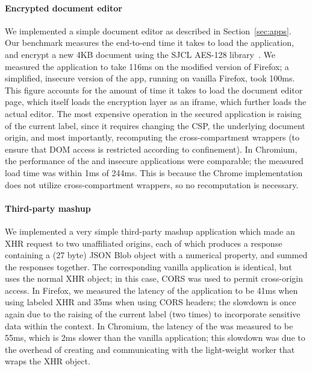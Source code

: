 \paragraph{Encrypted document editor}

We implemented a simple document editor as described in
Section~\ref{sec:apps}.
%
Our benchmark measures the end-to-end time it takes to load the
application, and encrypt a new 4KB document using
the SJCL AES-128 library~\cite{sjcl}.
%
We measured the \sys{} application to take 116ms on the modified
version of Firefox; a simplified, insecure version of the app,
running on vanilla Firefox, took 100ms.
%
This figure accounts for the amount of time it takes to
load the document editor page, which itself loads the encryption layer
as an iframe, which further loads the actual editor.
%
The most expensive operation in the secured application
is raising of the current label, since it requires changing the CSP, the
underlying document origin, and most importantly, recomputing the
cross-compartment wrappers (to ensure that DOM access is restricted
according to confinement).
%
In Chromium, the performance of the \sys{} and insecure applications
were comparable; the measured load time was within 1ms of 244ms.
%
This is because the Chrome implementation does not utilize cross-compartment
wrappers, so no recomputation is necessary.


\paragraph{Third-party mashup}

We implemented a very simple third-party mashup application which
made an XHR request to two unaffiliated origins, each
of which produces a response containing a (27 byte) JSON Blob
object with a numerical property, and summed the responses
together.
%
The corresponding vanilla application is identical, but uses the normal
XHR object; in this case, CORS was used to permit cross-origin access.
%
In Firefox, we measured the latency of the application to be 41ms when
using labeled XHR and 35ms when using CORS headers; the slowdown is once
again due to the raising of the current label (two times) to incorporate
sensitive data within the context.
%
In Chromium, the latency of the \sys{} was measured to be 55ms, 
which is 2ms slower than the vanilla application; this
slowdown was due to the overhead of creating and communicating with the light-weight worker
that wraps the XHR object.

